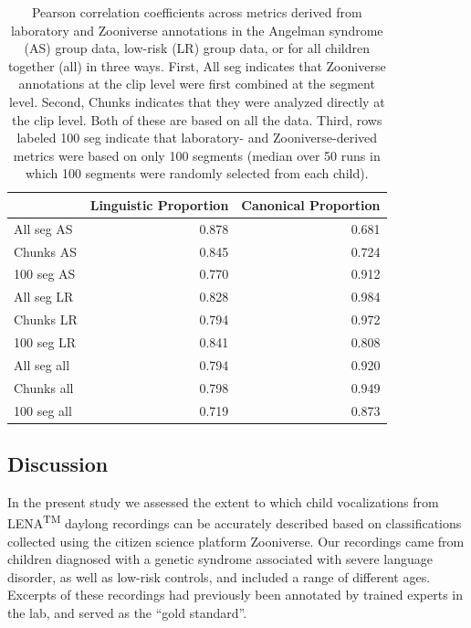 \documentclass[english,,man]{apa6}
\begin{document}
\begin{table}

\caption{\label{tab:tab-cors}Pearson correlation coefficients across metrics derived from laboratory and Zooniverse annotations in the Angelman syndrome (AS) group data, low-risk (LR) group data, or for all children together (all) in three ways. First, All seg indicates that Zooniverse annotations at the clip level were first combined at the segment level. Second, Chunks indicates that they were analyzed directly at the clip level. Both of these are based on all the data. Third, rows labeled 100 seg indicate that laboratory- and Zooniverse-derived metrics were based on only 100 segments (median over 50 runs in which 100 segments were randomly selected from each child).}
\centering
\begin{tabular}[t]{l|r|r}
\hline
  & Linguistic Proportion & Canonical Proportion\\
\hline
All seg AS & 0.878 & 0.681\\
\hline
Chunks AS & 0.845 & 0.724\\
\hline
100 seg AS & 0.770 & 0.912\\
\hline
All seg LR & 0.828 & 0.984\\
\hline
Chunks LR & 0.794 & 0.972\\
\hline
100 seg LR & 0.841 & 0.808\\
\hline
All seg all & 0.794 & 0.920\\
\hline
Chunks all & 0.798 & 0.949\\
\hline
100 seg all & 0.719 & 0.873\\
\hline
\end{tabular}
\end{table}

\hypertarget{discussion}{%
\subsection{Discussion}\label{discussion}}

In the present study we assessed the extent to which child vocalizations from LENA\textsuperscript{TM} daylong recordings can be accurately described based on classifications collected using the citizen science platform Zooniverse. Our recordings came from children diagnosed with a genetic syndrome associated with severe language disorder, as well as low-risk controls, and included a range of different ages. Excerpts of these recordings had previously been annotated by trained experts in the lab, and served as the \enquote{gold standard}.
\end{document}
